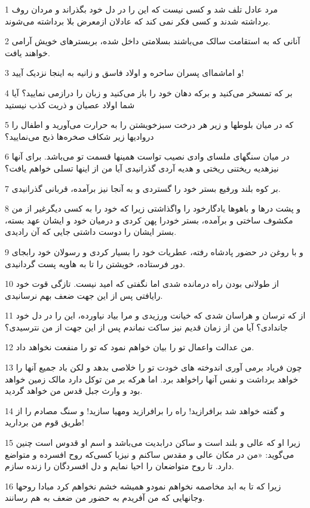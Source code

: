 \par 1 مرد عادل تلف شد و کسی نیست که این را در دل خود بگذراند و مردان روف برداشته شدند و کسی فکر نمی کند که عادلان ازمعرض بلا برداشته می‌شوند.
\par 2 آنانی که به استقامت سالک می‌باشند بسلامتی داخل شده، بربسترهای خویش آرامی خواهند یافت.
\par 3 و اماشما‌ای پسران ساحره و اولاد فاسق و زانیه به اینجا نزدیک آیید!
\par 4 بر که تمسخر می‌کنید و برکه دهان خود را باز می‌کنید و زبان را درازمی نمایید؟ آیا شما اولاد عصیان و ذریت کذب نیستید
\par 5 که در میان بلوطها و زیر هر درخت سبزخویشتن را به حرارت می‌آورید و اطفال را دروادیها زیر شکاف صخره‌ها ذبح می‌نمایید؟
\par 6 در میان سنگهای ملسای وادی نصیب تواست همینها قسمت تو می‌باشد. برای آنها نیزهدیه ریختنی ریختی و هدیه آردی گذرانیدی آیا من از اینها تسلی خواهم یافت؟
\par 7 بر کوه بلند ورفیع بستر خود را گستردی و به آنجا نیز برآمده، قربانی گذرانیدی.
\par 8 و پشت درها و باهوها یادگارخود را واگذاشتی زیرا که خود را به کسی دیگرغیر از من مکشوف ساختی و برآمده، بستر خودرا پهن کردی و درمیان خود و ایشان عهد بسته، بستر ایشان را دوست داشتی جایی که آن رادیدی.
\par 9 و با روغن در حضور پادشاه رفته، عطریات خود را بسیار کردی و رسولان خود رابجای دور فرستاده، خویشتن را تا به هاویه پست گردانیدی.
\par 10 از طولانی بودن راه درمانده شدی اما نگفتی که امید نیست. تازگی قوت خود رایافتی پس از این جهت ضعف بهم نرسانیدی.
\par 11 از که ترسان و هراسان شدی که خیانت ورزیدی و مرا بیاد نیاورده، این را در دل خود جاندادی؟ آیا من از زمان قدیم نیز ساکت نماندم پس از این جهت از من نترسیدی؟
\par 12 من عدالت واعمال تو را بیان خواهم نمود که تو را منفعت نخواهد داد.
\par 13 چون فریاد برمی آوری اندوخته های خودت تو را خلاصی بدهد و لکن باد جمیع آنها را خواهد برداشت و نفس آنها راخواهد برد. اما هر‌که بر من توکل دارد مالک زمین خواهد بود و وارث جبل قدس من خواهد گردید.
\par 14 و گفته خواهد شد برافرازید! راه را برافرازید ومهیا سازید! و سنگ مصادم را از طریق قوم من بردارید!
\par 15 زیرا او که عالی و بلند است و ساکن درابدیت می‌باشد و اسم او قدوس است چنین می‌گوید: «من در مکان عالی و مقدس ساکنم و نیزبا کسی‌که روح افسرده و متواضع دارد. تا روح متواضعان را احیا نمایم و دل افسردگان را زنده سازم.
\par 16 زیرا که تا به ابد مخاصمه نخواهم نمودو همیشه خشم نخواهم کرد مبادا روحها وجانهایی که من آفریدم به حضور من ضعف به هم رسانند.
